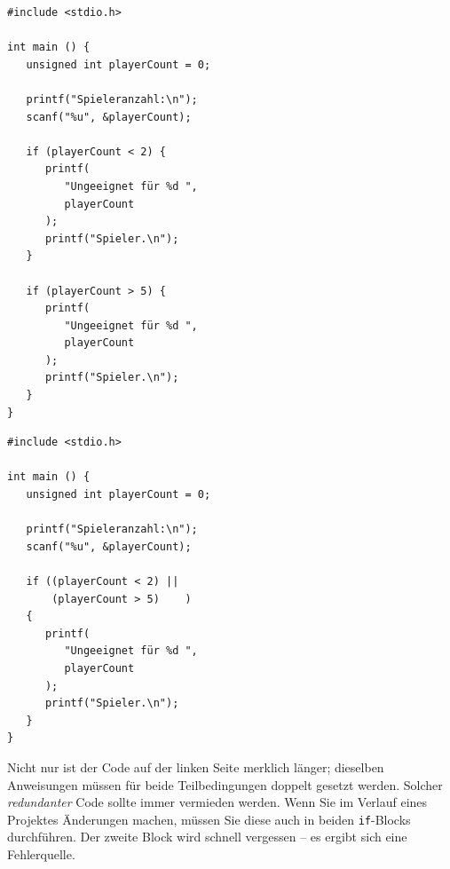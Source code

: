 \begin{tcbraster}[raster columns=2,
                  raster equal height,
                  nobeforeafter,
                  raster column skip=0.5cm]
	\begin{codebox}
	\begin{verbatim}
#include <stdio.h>

int main () {
   unsigned int playerCount = 0;
   
   printf("Spieleranzahl:\n");
   scanf("%u", &playerCount);
   
   if (playerCount < 2) {
      printf(
         "Ungeeignet für %d ",
         playerCount
      );
      printf("Spieler.\n");
   }
   
   if (playerCount > 5) {
      printf(
         "Ungeeignet für %d ",
         playerCount
      );
      printf("Spieler.\n");
   }
}
	\end{verbatim}
	\end{codebox}
%
	\begin{codebox}
	\begin{verbatim}
#include <stdio.h>

int main () {
   unsigned int playerCount = 0;
   
   printf("Spieleranzahl:\n");
   scanf("%u", &playerCount);
   
   if ((playerCount < 2) ||
       (playerCount > 5)    )
   {
      printf(
         "Ungeeignet für %d ",
         playerCount
      );
      printf("Spieler.\n");
   }
}
	\end{verbatim}
	\end{codebox}
\end{tcbraster}

Nicht nur ist der Code auf der linken Seite merklich länger; dieselben Anweisungen müssen für beide Teilbedingungen doppelt gesetzt werden. Solcher \emph{redundanter} Code sollte immer vermieden werden. Wenn Sie im Verlauf eines Projektes Änderungen machen, müssen Sie diese auch in beiden \texttt{if}-Blocks durchführen. Der zweite Block wird schnell vergessen -- es ergibt sich eine Fehlerquelle.


